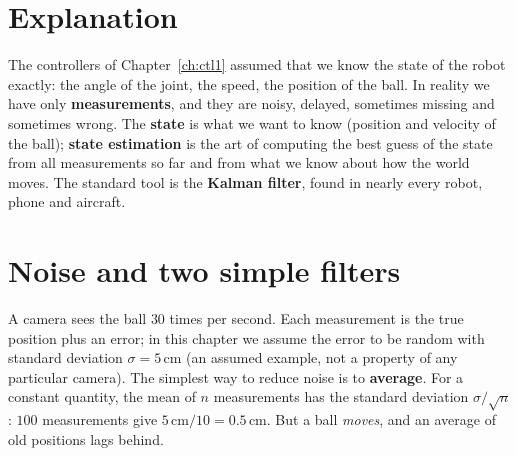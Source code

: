 \label{ch:ctl3}

\section*{Explanation}
The controllers of Chapter~\ref{ch:ctl1} assumed that we know the state of the robot exactly: the angle of the joint, the speed, the position of the ball. In reality we have only \textbf{measurements}, and they are noisy, delayed, sometimes missing and sometimes wrong. The \textbf{state} is what we want to know (position and velocity of the ball); \textbf{state estimation} is the art of computing the best guess of the state from all measurements so far and from what we know about how the world moves. The standard tool is the \textbf{Kalman filter}, found in nearly every robot, phone and aircraft.

\begin{center}
\end{center}

\section*{Noise and two simple filters}
A camera sees the ball $30$ times per second. Each measurement is the true position plus an error; in this chapter we assume the error to be random with standard deviation $\sigma=5$\,cm (an assumed example, not a property of any particular camera). The simplest way to reduce noise is to \textbf{average}. For a constant quantity, the mean of $n$ measurements has the standard deviation $\sigma/\sqrt n$: $100$ measurements give $5\,\text{cm}/10=0.5$\,cm. But a ball \emph{moves}, and an average of old positions lags behind.

